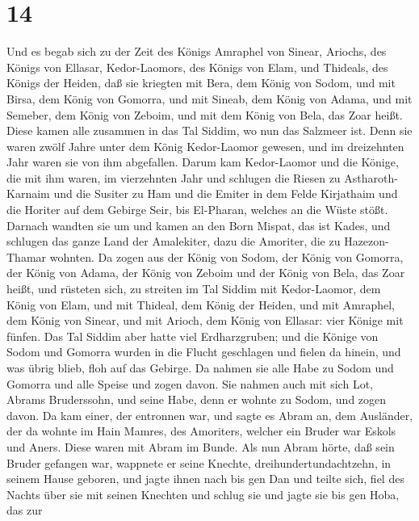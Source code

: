 \hypertarget{section-13}{%
\section{14}\label{section-13}}

 Und es begab sich zu der Zeit des Königs Amraphel von
Sinear, Ariochs, des Königs von Ellasar, Kedor-Laomors, des Königs von
Elam, und Thideals, des Königs der Heiden,  daß sie kriegten
mit Bera, dem König von Sodom, und mit Birsa, dem König von Gomorra, und
mit Sineab, dem König von Adama, und mit Semeber, dem König von Zeboim,
und mit dem König von Bela, das Zoar heißt.  Diese kamen
alle zusammen in das Tal Siddim, wo nun das Salzmeer ist. 
Denn sie waren zwölf Jahre unter dem König Kedor-Laomor gewesen, und im
dreizehnten Jahr waren sie von ihm abgefallen.  Darum kam
Kedor-Laomor und die Könige, die mit ihm waren, im vierzehnten Jahr und
schlugen die Riesen zu Astharoth-Karnaim und die Susiter zu Ham und die
Emiter in dem Felde Kirjathaim  und die Horiter auf dem
Gebirge Seir, bis El-Pharan, welches an die Wüste stößt. 
Darnach wandten sie um und kamen an den Born Mispat, das ist Kades, und
schlugen das ganze Land der Amalekiter, dazu die Amoriter, die zu
Hazezon-Thamar wohnten.  Da zogen aus der König von Sodom,
der König von Gomorra, der König von Adama, der König von Zeboim und der
König von Bela, das Zoar heißt, und rüsteten sich, zu streiten im Tal
Siddim  mit Kedor-Laomor, dem König von Elam, und mit
Thideal, dem König der Heiden, und mit Amraphel, dem König von Sinear,
und mit Arioch, dem König von Ellasar: vier Könige mit fünfen.
 Das Tal Siddim aber hatte viel Erdharzgruben; und die
Könige von Sodom und Gomorra wurden in die Flucht geschlagen und fielen
da hinein, und was übrig blieb, floh auf das Gebirge.  Da
nahmen sie alle Habe zu Sodom und Gomorra und alle Speise und zogen
davon.  Sie nahmen auch mit sich Lot, Abrams Bruderssohn,
und seine Habe, denn er wohnte zu Sodom, und zogen davon. 
Da kam einer, der entronnen war, und sagte es Abram an, dem Ausländer,
der da wohnte im Hain Mamres, des Amoriters, welcher ein Bruder war
Eskols und Aners. Diese waren mit Abram im Bunde.  Als nun
Abram hörte, daß sein Bruder gefangen war, wappnete er seine Knechte,
dreihundertundachtzehn, in seinem Hause geboren, und jagte ihnen nach
bis gen Dan  und teilte sich, fiel des Nachts über sie mit
seinen Knechten und schlug sie und jagte sie bis gen Hoba, das zur
